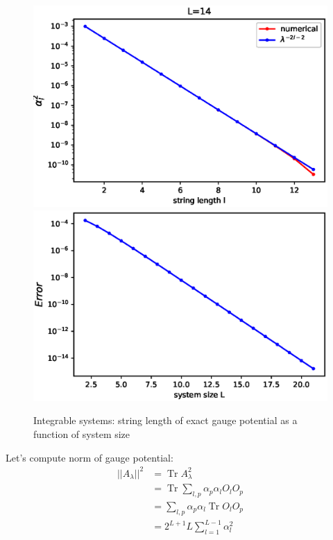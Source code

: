 \documentclass[11pt,a4paper]{article}
\DeclareMathOperator{\Tr}{Tr}
\begin{document}
\begin{figure}[!ht]
\begin{center}
\includegraphics[scale=0.52]{new_pics/alpha_num_theoret.eps}
\includegraphics[scale=0.52]{new_pics/error_alpha.eps}
\caption{Integrable systems: string length of exact gauge potential as a function of system size }
\end{center}
\end{figure}

Let's compute norm of gauge potential:
\begin{align}
||A_{\lambda}||^2 &= \Tr  A_{\lambda}^2 \\
&= \Tr \sum_{l,p}  \alpha_p \alpha_l O_l  O_p\\
&=  \sum_{l,p}  \alpha_p \alpha_l  \Tr O_l  O_p\\
&=  2^{L+1} L \sum_{l=1}^{L-1}   \alpha_l ^2
\end{align}
\end{document}
